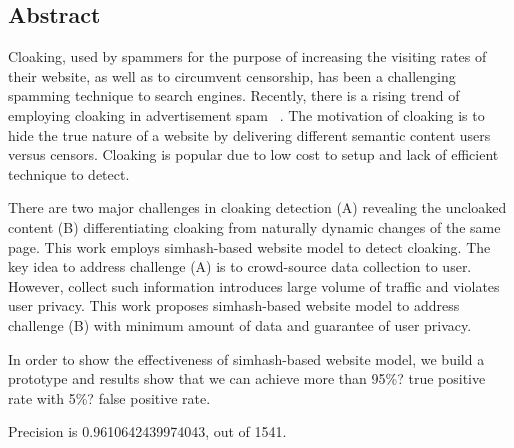 
\subsection*{Abstract}
Cloaking, used by spammers for the purpose of increasing the visiting rates of
their website, as well as to circumvent censorship, has been a challenging
spamming technique to search engines. Recently, there is a rising trend of
employing
cloaking in advertisement spam ~\cite{li2012knowing}.  The motivation of
cloaking 
is to hide the true nature of a website by delivering different semantic
content users versus censors.
Cloaking is popular due to low cost to setup and lack of efficient technique
to detect.

There are two major challenges in cloaking detection (A) revealing the
uncloaked content 
(B) differentiating cloaking from naturally dynamic changes of the same page.
This work employs
simhash-based website model to detect cloaking. The key idea to address
challenge 
(A) is to crowd-source data collection to user. However, collect such
information 
introduces large volume of traffic and violates user privacy. 
This work proposes simhash-based website model to address challenge (B)
with minimum amount of data and guarantee of user privacy.

In order to show the effectiveness of simhash-based website model, we build
a prototype and results 
show that we can achieve more than 95\%? true positive rate with 5\%? false
positive rate.

Precision is 0.9610642439974043, out of 1541.


